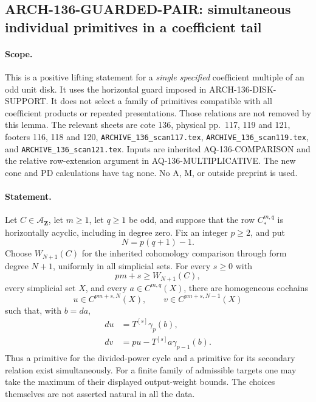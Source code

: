\subsection{ARCH-136-GUARDED-PAIR: simultaneous individual primitives in a coefficient tail}
\label{sec:arch136guardedpair}

\paragraph{Scope.}
This is a positive lifting statement for a \emph{single specified}
coefficient multiple of an odd unit disk. It uses the horizontal
guard imposed in ARCH-136-DISK-SUPPORT. It does not select a family
of primitives compatible with all coefficient products or repeated
presentations. Those relations are not removed by this lemma.
The relevant sheets are cote 136, physical pp.~117, 119 and 121,
footers 116, 118 and 120,
\texttt{ARCHIVE\_136\_scan117.tex},
\texttt{ARCHIVE\_136\_scan119.tex}, and
\texttt{ARCHIVE\_136\_scan121.tex}.
Inputs are inherited AQ-136-COMPARISON and the relative row-extension
argument in AQ-136-MULTIPLICATIVE. The new cone and PD calculations
have tag none. No A, M, or outside preprint is used.

\paragraph{Statement.}
Let \(C\in\mathcal A_{\mathbf Z}\), let \(m\geq1\), let \(q\geq1\) be odd, and
suppose that the row \(C_*^{m,q}\) is horizontally acyclic,
including in degree zero. Fix an integer \(p\geq2\), and put
\[
                    N=p(q+1)-1.
\]
Choose \(W_{N+1}(C)\) for the inherited cohomology comparison
through form degree \(N+1\), uniformly in all simplicial sets.
For every \(s\geq0\) with
\[
                         pm+s\geq W_{N+1}(C),
 \tag{136.GP1}
\]
every simplicial set \(X\), and every
\(a\in C^{m,q}(X)\), there are homogeneous cochains
\[
 u\in C^{pm+s,N}(X),\qquad
 v\in C^{pm+s,N-1}(X)
\]
such that, with \(b=da\),
\[
 \begin{split}
 du&=T^{[s]}\gamma_p(b),\\
 dv&=p u-T^{[s]}a\gamma_{p-1}(b).
 \end{split}
 \tag{136.GP2}
\]
Thus a primitive for the divided-power cycle and a primitive for
its secondary relation exist simultaneously. For a finite family
of admissible targets one may take the maximum of their displayed
output-weight bounds. The choices themselves are not asserted
natural in all the data.

